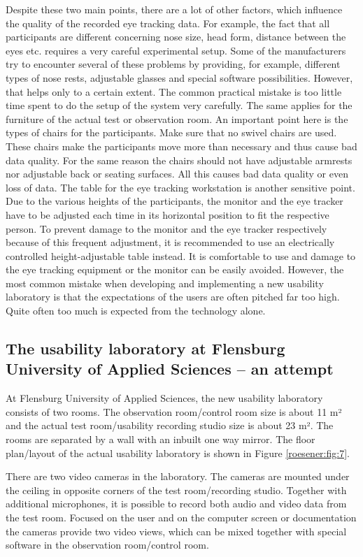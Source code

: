 \documentclass[output=paper]{langsci/langscibook}
\begin{document}
Despite these two main points, there are a lot of other factors, which influence the quality of the recorded eye tracking data. For example, the fact that all participants are different concerning nose size, head form, distance between the eyes etc. requires a very careful experimental setup. Some of the manufacturers try to encounter several of these problems by providing, for example, different types of nose rests, adjustable glasses and special software possibilities. However, that helps only to a certain extent. The common practical mistake is too little time spent to do the setup of the system very carefully. The same applies for the furniture of the actual test or observation room. An important point here is the types of chairs for the participants. Make sure that no swivel chairs are used. These chairs make the participants move more than necessary and thus cause bad data quality. For the same reason the chairs should not have adjustable armrests nor adjustable back or seating surfaces. All this causes bad data quality or even loss of data. The table for the eye tracking workstation is another sensitive point. Due to the various heights of the participants, the monitor and the eye tracker have to be adjusted each time in its horizontal position to fit the respective person. To prevent damage to the monitor and the eye tracker respectively because of this frequent adjustment, it is recommended to use an electrically controlled height-adjustable table instead. It is comfortable to use and damage to the eye tracking equipment or the monitor can be easily avoided. However, the most common mistake when developing and implementing a new usability laboratory is that the expectations of the users are often pitched far too high. Quite often too much is expected from the technology alone. 


\subsection{The usability laboratory at Flensburg University of Applied Sciences – an attempt }

At Flensburg University of Applied Sciences, the new usability laboratory consists of two rooms. The observation room/control room size is about 11 m² and the actual test room/usability recording studio size is about 23 m². The rooms are separated by a wall with an inbuilt one way mirror. The floor plan/layout of the actual usability laboratory is shown in Figure \ref{roesener:fig:7}. 


There are two video cameras in the laboratory. The cameras are mounted under the ceiling in opposite corners of the test room/recording studio. Together with additional microphones, it is possible to record both audio and video data from the test room. Focused on the user and on the computer screen or documentation the cameras provide two video views, which can be mixed together with special software in the observation room/control room. 
\end{document}

